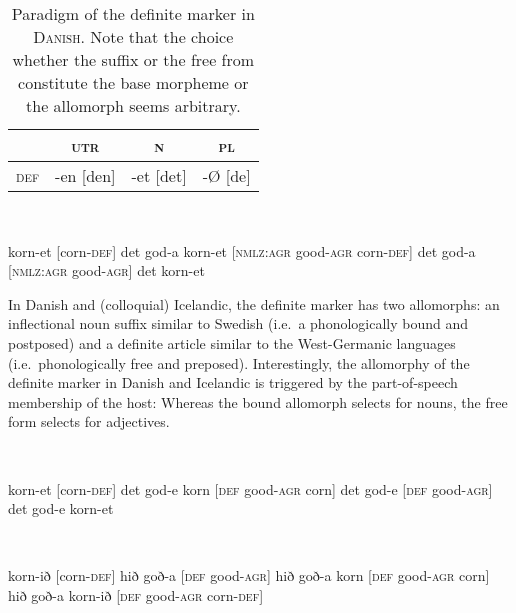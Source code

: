 {%
\begin{table}
\begin{tabular}{l | ccc}
\hline\hline%
			&\textsc{utr}	&\textsc{n}		&\textsc{pl}\\
\hline%
\textsc{def}	&-en [den]		&-et [det]			&-{Ø} [de]\\
\hline\hline%
\end{tabular}
\caption[Paradigm of \textsc{def} in \textsc{Danish}]{Paradigm of the definite marker in \textsc{Danish}. Note that the choice whether the suffix or the free from constitute the base morpheme or the allomorph seems arbitrary.}
\label{danish defallomorph}
\end{table}
\begin{exe}
\ex {}\\
\begin{xlist}
\ex korn-et [corn-\textsc{def}]
\ex det god-a korn-et [\textsc{nmlz:agr} good-\textsc{agr} corn-\textsc{def}]
\ex det god-a [\textsc{nmlz:agr} good-\textsc{agr}]
\ex *det korn-et
\end{xlist}
\end{exe}
In Danish and (colloquial) Icelandic, the definite marker has two allomorphs: an inflectional noun suffix similar to Swedish (i.e.~a phonologically bound and postposed) and a definite article similar to the West-Germanic languages (i.e.~phonologically free and preposed). Interestingly, the allomorphy of the definite marker in Danish and Icelandic is triggered by the part-of-speech membership of the host: Whereas the bound allomorph selects for nouns, the free form selects for adjectives.
\begin{exe}
\ex {}\\
\begin{xlist}
\ex 	korn-et [corn-\textsc{def}]
\ex	det god-e korn [\textsc{def} good-\textsc{agr} corn]
\ex	det god-e [\textsc{def} good-\textsc{agr}]
\ex	*det god-e korn-et
\end{xlist}
\end{exe}
\begin{exe}
\ex {}\\
\begin{xlist}
\ex 	korn-ið [corn-\textsc{def}]
\ex	hið goð-a [\textsc{def} good-\textsc{agr}]
\ex	hið goð-a korn [\textsc{def} good-\textsc{agr} corn]
\ex	*hið goð-a korn-ið [\textsc{def} good-\textsc{agr} corn-\textsc{def}]
\end{xlist}
\end{exe}

}
